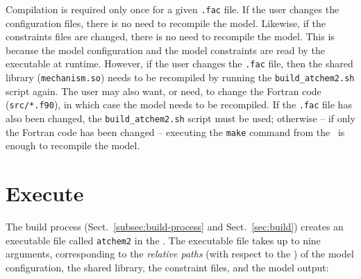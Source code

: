Compilation is required only once for a given \texttt{.fac} file. If
the user changes the configuration files, there is no need to
recompile the model. Likewise, if the constraints files are changed,
there is no need to recompile the model. This is because the model
configuration and the model constraints are read by the executable at
runtime. However, if the user changes the \texttt{.fac} file, then the
shared library (\texttt{mechanism.so}) needs to be recompiled by
running the \texttt{build\_atchem2.sh} script again. The user may also
want, or need, to change the Fortran code (\texttt{src/*.f90}), in
which case the model needs to be recompiled. If the \texttt{.fac} file
has also been changed, the \texttt{build\_atchem2.sh} script must be
used; otherwise -- if only the Fortran code has been changed --
executing the \verb|make| command from the \maindir\ is enough to
recompile the model.

\section{Execute} \label{sec:execute}

The build process (Sect.~\ref{subsec:build-process} and
Sect.~\ref{sec:build}) creates an executable file called
\texttt{atchem2} in the \maindir. The executable file takes up to nine
arguments, corresponding to the \emph{relative paths} (with respect to
the \maindir) of the model configuration, the shared library, the
constraint files, and the model output:

